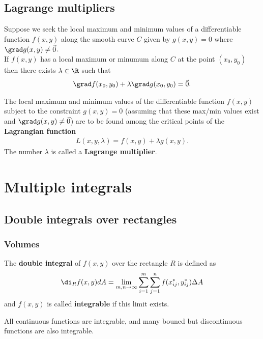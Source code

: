 \documentclass{article}
\begin{document}
\subsection{Lagrange multipliers}


\begin{theorem}
	Suppose we seek the local maximum and minimum values of a differentiable
	function $f(x,y)$ along the smooth curve $C$ given by $g(x,y)=0$ where
	$\grad g(x,y)\not=\vec 0$.\\
	If $f(x,y)$ has a local maximum or minumum along $C$ at the point
	$(x_0, y_0)$ then there exists $\lambda\in\R$ such that
	\begin{align*}
		\grad f(x_0, y_0) + \lambda\grad g(x_0, y_0) = \vec 0.
	\end{align*}
\end{theorem}
\begin{theorem}
	The local maximum and minimum values of the differentiable function
	$f(x,y)$ subject to the constraint $g(x,y)=0$ (assuming that these
	max/min values exist and $\grad g(x,y)\not=\vec 0$) are to be found
	among the critical points of the \textbf{Lagrangian function}
	\begin{align*}
		L(x,y,\lambda)=f(x,y)+\lambda g(x,y).
	\end{align*}
	The number $\lambda$ is called a \textbf{Lagrange multiplier}.
\end{theorem}



\section{Multiple integrals}



\subsection{Double integrals over rectangles}


\subsubsection{Volumes}

\begin{definition}
	The \textbf{double integral} of $f(x,y)$ over the rectangle $R$ is defined as
	\begin{align*}
		\di_R f(x,y)dA = \lim_{m,n\to\infty}\sum_{i=1}^m\sum_{j=1}^n f(x_{ij}^*, y_{ij}^*)\Delta A
	\end{align*}
	and $f(x,y)$ is called \textbf{integrable} if this limit exists.
\end{definition}
\begin{lemma}
	All continuous functions are integrable, and many bouned but
	discontinuous functions are also integrable.
\end{lemma}
\end{document}
